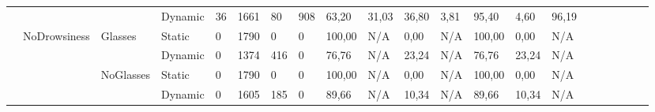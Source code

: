 \documentclass[12pt]{article}
\begin{document}
\begin{landscape}
\begin{table}[]
\begin{adjustbox}{width=1.4\textwidth}
\begin{tabular}{lllllllllllllllccllll}
				\multicolumn{1}{|l|}{} & \multicolumn{1}{l|}{} & \multicolumn{1}{l|}{} & \multicolumn{1}{l|}{Dynamic} & \multicolumn{1}{l|}{36} & \multicolumn{1}{l|}{1661} & \multicolumn{1}{l|}{80} & \multicolumn{1}{l|}{908} & \multicolumn{1}{l|}{63,20} & \multicolumn{1}{l|}{31,03} & \multicolumn{1}{l|}{36,80} & \multicolumn{1}{l|}{3,81} & \multicolumn{1}{l|}{95,40} & \multicolumn{1}{l|}{4,60} & \multicolumn{1}{l|}{96,19} & \multicolumn{1}{c|}{} & \multicolumn{1}{c|}{} & \multicolumn{1}{l|}{} & \multicolumn{1}{l|}{} & \multicolumn{1}{l|}{} & \multicolumn{1}{l|}{} \\ \cline{2-15}
				\multicolumn{1}{|l|}{} & \multicolumn{1}{l|}{\multirow{4}{*}{NoDrowsiness}} & \multicolumn{1}{l|}{\multirow{2}{*}{Glasses}} & \multicolumn{1}{l|}{Static} & \multicolumn{1}{l|}{0} & \multicolumn{1}{l|}{1790} & \multicolumn{1}{l|}{0} & \multicolumn{1}{l|}{0} & \multicolumn{1}{l|}{100,00} & \multicolumn{1}{l|}{N/A} & \multicolumn{1}{l|}{0,00} & \multicolumn{1}{l|}{N/A} & \multicolumn{1}{l|}{100,00} & \multicolumn{1}{l|}{0,00} & \multicolumn{1}{l|}{N/A} & \multicolumn{1}{c|}{} & \multicolumn{1}{c|}{} & \multicolumn{1}{l|}{} & \multicolumn{1}{l|}{} & \multicolumn{1}{l|}{} & \multicolumn{1}{l|}{} \\ \cline{4-15}
				\multicolumn{1}{|l|}{} & \multicolumn{1}{l|}{} & \multicolumn{1}{l|}{} & \multicolumn{1}{l|}{Dynamic} & \multicolumn{1}{l|}{0} & \multicolumn{1}{l|}{1374} & \multicolumn{1}{l|}{416} & \multicolumn{1}{l|}{0} & \multicolumn{1}{l|}{76,76} & \multicolumn{1}{l|}{N/A} & \multicolumn{1}{l|}{23,24} & \multicolumn{1}{l|}{N/A} & \multicolumn{1}{l|}{76,76} & \multicolumn{1}{l|}{23,24} & \multicolumn{1}{l|}{N/A} & \multicolumn{1}{c|}{} & \multicolumn{1}{c|}{} & \multicolumn{1}{l|}{} & \multicolumn{1}{l|}{} & \multicolumn{1}{l|}{} & \multicolumn{1}{l|}{} \\ \cline{3-15}
				\multicolumn{1}{|l|}{} & \multicolumn{1}{l|}{} & \multicolumn{1}{l|}{\multirow{2}{*}{NoGlasses}} & \multicolumn{1}{l|}{Static}  & \multicolumn{1}{l|}{0} & \multicolumn{1}{l|}{1790} & \multicolumn{1}{l|}{0} & \multicolumn{1}{l|}{0} & \multicolumn{1}{l|}{100,00} & \multicolumn{1}{l|}{N/A} & \multicolumn{1}{l|}{0,00} & \multicolumn{1}{l|}{N/A} & \multicolumn{1}{l|}{100,00} & \multicolumn{1}{l|}{0,00} & \multicolumn{1}{l|}{N/A} & \multicolumn{1}{c|}{} & \multicolumn{1}{c|}{} & \multicolumn{1}{l|}{} & \multicolumn{1}{l|}{} & \multicolumn{1}{l|}{} & \multicolumn{1}{l|}{} \\ \cline{4-15}
				\multicolumn{1}{|l|}{} & \multicolumn{1}{l|}{} & \multicolumn{1}{l|}{} & \multicolumn{1}{l|}{Dynamic} & \multicolumn{1}{l|}{0} & \multicolumn{1}{l|}{1605} & \multicolumn{1}{l|}{185} & \multicolumn{1}{l|}{0} & \multicolumn{1}{l|}{89,66} & \multicolumn{1}{l|}{N/A} & \multicolumn{1}{l|}{10,34} & \multicolumn{1}{l|}{N/A} & \multicolumn{1}{l|}{89,66} & \multicolumn{1}{l|}{10,34} & \multicolumn{1}{l|}{N/A} & \multicolumn{1}{c|}{} & \multicolumn{1}{c|}{} & \multicolumn{1}{l|}{} & \multicolumn{1}{l|}{} & \multicolumn{1}{l|}{} & \multicolumn{1}{l|}{} \\ \hline

\end{tabular}
\end{adjustbox}
\end{table}
\end{landscape}
\end{document}
